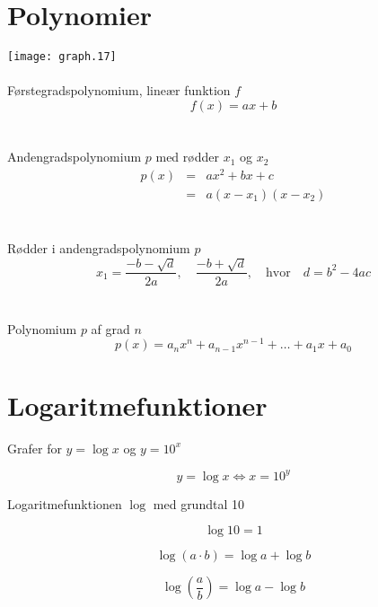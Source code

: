 \documentclass[11pt,a4paper,landscape,twocolumn,fleqn,leqno]{article}
\begin{document}
\newpage

\section{Polynomier}

\texttt{[image: graph.17]}
\\
\\
Førstegradspolynomium, lineær funktion $f$
\begin{equation}
f(x) = ax+b
\end{equation}
\\
\\
Andengradspolynomium $p$ med rødder $x_1$ og $x_2$
\begin{eqnarray}
p(x) & = & ax^2 + bx + c \\
 & = & a(x-x_1)(x-x_2) \nonumber
\end{eqnarray}
\\
\\
Rødder i andengradspolynomium $p$
\begin{equation}
x_1 = \frac{-b - \sqrt{d}}{2a}, \quad \frac{-b + \sqrt{d}}{2a}, \quad \text{hvor} \quad d = b^2 - 4ac
\end{equation}
\\
\\
Polynomium $p$ af grad $n$
\begin{equation}
p(x) = a_nx^n + a_{n-1}x^{n-1} + \dots + a_1x + a_0
\end{equation}

\vfill

\section{Logaritmefunktioner}

Grafer for $y = \log x$ og $y = 10^x$

\begin{equation}
y = \log x \Leftrightarrow x = 10^y
\end{equation}

Logaritmefunktionen $\log$ med grundtal 10

\begin{equation}
\log 10 = 1
\end{equation}

\begin{equation}
\log(a \cdot b) = \log a + \log b
\end{equation}

\begin{equation}
\log\left(\frac{a}{b}\right) = \log a - \log b
\end{equation}
\end{document}
